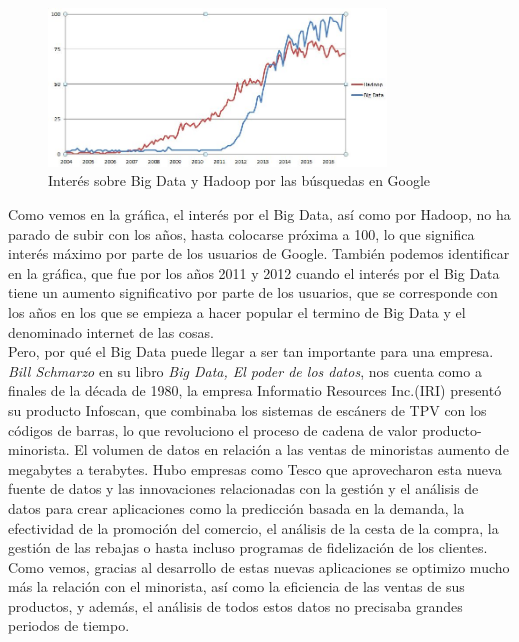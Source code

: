 \begin{figure}[H]
	\centering
	\includegraphics[width=0.8\textwidth]{./imagenes/Interes_Google}
	\caption{Interés sobre Big Data y Hadoop por las búsquedas en Google \cite{Google_trends}} 
	
\end{figure}

Como vemos en la gráfica, el interés por el Big Data, así como por Hadoop, no ha parado de subir con los años, hasta colocarse próxima a 100, lo que significa interés máximo por parte de los usuarios de Google.
También podemos identificar en la gráfica, que fue por los años 2011 y 2012 cuando el interés por el Big Data tiene un aumento significativo por parte de los usuarios, que se corresponde con los años en los que se empieza a hacer popular el termino de Big Data y el denominado internet de las cosas.\\


Pero, por qué el Big Data puede llegar a ser tan importante para una empresa.\\

\emph{Bill Schmarzo} en su libro \emph{Big Data, El poder de los datos}, nos cuenta como a finales de la década de 1980, la empresa Informatio Resources Inc.(IRI) presentó su producto Infoscan, que combinaba los sistemas de escáners de TPV con los códigos de barras, lo que revoluciono el proceso de cadena de valor producto-minorista. El volumen de datos en relación a las ventas de minoristas aumento de megabytes a terabytes.
Hubo empresas como Tesco que aprovecharon esta nueva fuente de datos y las innovaciones relacionadas con la gestión y el análisis de datos para crear aplicaciones como la predicción basada en la demanda, la efectividad de la promoción del comercio, el análisis de la cesta de la compra, la gestión de las rebajas o hasta incluso programas de fidelización de los clientes.\\

Como vemos, gracias al desarrollo de estas nuevas aplicaciones se optimizo mucho más la relación con el minorista, así como la eficiencia de las ventas de sus productos, y además, el análisis de todos estos datos no precisaba grandes periodos de tiempo.\\

